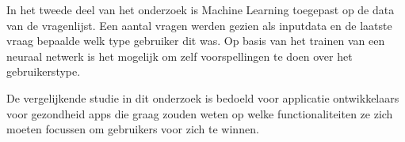 In het tweede deel van het onderzoek is Machine Learning toegepast op de data van de vragenlijst. Een aantal vragen werden gezien als inputdata en de laatste vraag bepaalde welk type gebruiker dit was. Op basis van het trainen van een neuraal netwerk is het mogelijk om zelf voorspellingen te doen over het gebruikerstype. 

De vergelijkende studie in dit onderzoek is bedoeld voor applicatie ontwikkelaars voor gezondheid apps die graag zouden weten op welke functionaliteiten ze zich moeten focussen om gebruikers voor zich te winnen. 

